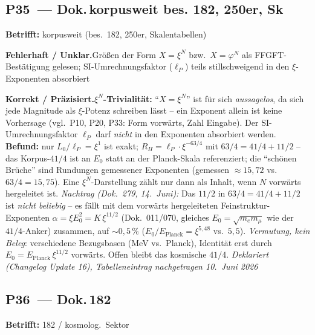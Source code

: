 \medskip


\subsection*{P35~--- Dok.\,korpusweit bes. 182, 250er, Sk}

\noindent\textbf{Betrifft:} korpusweit (bes.\ 182, 250er, Skalentabellen)


\smallskip\noindent\textbf{Fehlerhaft / Unklar.}\quad Größen der Form $X = \xi^N$ bzw.\ $X = \varphi^N$ als FFGFT-Bestätigung gelesen; SI-Umrechnungsfaktor ($\ell_P$) teils stillschweigend in den $\xi$-Exponenten absorbiert


\smallskip\noindent\textbf{Korrekt / Präzisiert.}\quad \textbf{$\xi^N$-Trivialität:} \enquote{$X = \xi^N$} ist für sich \emph{aussagelos}, da sich jede Magnitude als $\xi$-Potenz schreiben lässt -- ein Exponent allein ist keine Vorhersage (vgl.\ P10, P20, P33: Form vorwärts, Zahl Eingabe). Der SI-Umrechnungsfaktor $\ell_P$ darf \emph{nicht} in den Exponenten absorbiert werden. \textbf{Befund:} nur $L_0/\ell_P = \xi^1$ ist exakt; $R_H = \ell_P\cdot\xi^{-63/4}$ mit $63/4 = 41/4 + 11/2$ -- das Korpus-$41/4$ ist an $E_0$ statt an der Planck-Skala referenziert; die \enquote{schönen Brüche} sind Rundungen gemessener Exponenten (gemessen $\approx 15{,}72$ vs.\ $63/4 = 15{,}75$). Eine $\xi^N$-Darstellung zählt nur dann als Inhalt, wenn $N$ vorwärts hergeleitet ist. \emph{Nachtrag (Dok.~279, 14.~Juni):} Das $11/2$ in $63/4=41/4+11/2$ ist \emph{nicht beliebig} -- es fällt mit dem vorwärts hergeleiteten Feinstruktur-Exponenten $\alpha=\xi E_0^2=K\,\xi^{11/2}$ (Dok.~011/070, gleiches $E_0=\sqrt{m_em_\mu}$ wie der $41/4$-Anker) zusammen, auf $\sim0{,}5\,\%$ ($E_0/E_\text{Planck}=\xi^{5{,}48}$ vs.\ $5{,}5$). \emph{Vermutung, kein Beleg}: verschiedene Bezugsbasen (MeV vs.\ Planck), Identität erst durch $E_0=E_\text{Planck}\,\xi^{11/2}$ vorwärts. Offen bleibt das kosmische $41/4$. \emph{Deklariert (Changelog Update 16), Tabelleneintrag nachgetragen 10.~Juni 2026}


\medskip


\subsection*{P36~--- Dok.\,182}

\noindent\textbf{Betrifft:} 182 / kosmolog.\ Sektor


